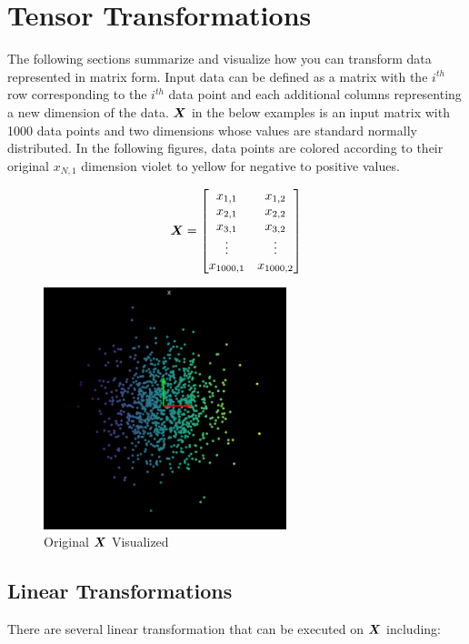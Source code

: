 \chapter{Tensor Transformations}

The following sections summarize and visualize how you can transform data represented in matrix form. 
Input data can be defined as a matrix with the $i^{th}$ row corresponding to the $i^{th}$ data point and each additional columns representing a new dimension of the data.
$\matr{X}$ in the below examples is an input matrix with 1000 data points and two dimensions whose values are standard normally distributed. 
In the following figures, data points are colored according to their original $x_{N,1}$  dimension violet to yellow for negative to positive values.

\[
\matr{X} =
\begin{bmatrix}
    x_{1,1} & x_{1,2} \\
    x_{2,1} & x_{2,2} \\
    x_{3,1} & x_{3,2} \\
    \vdots & \vdots  \\
    x_{1000,1} & x_{1000,2}
\end{bmatrix}
\]

\begin{figure}[H]
\begin{center}
\includegraphics[width=200pt]{figs/standardnormal.png}
\end{center} 
\caption{Original $\matr{X}$ Visualized}
\end{figure}

\section{Linear Transformations}
There are several linear transformation that can be executed on $\matr{X}$ including:

